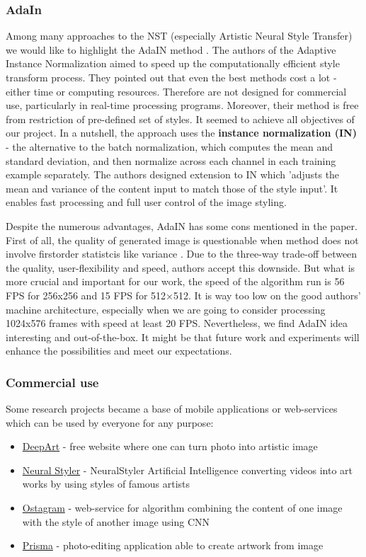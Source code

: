 \documentclass[../Main.tex]{subfiles}
\begin{document}
    \subsubsection{AdaIn}
    Among many approaches to the NST (especially Artistic Neural Style Transfer) we would like to highlight the AdaIN method \cite{huang2017adain}. The authors of the Adaptive Instance Normalization aimed to speed up the computationally efficient style transform process. They pointed out that even the best methods cost a lot - either time or computing resources. Therefore are not designed for commercial use, particularly in real-time processing programs. Moreover, their method is free from restriction of pre-defined set of styles. It seemed to achieve all objectives of our project.
    In a nutshell, the approach uses the \textbf{instance normalization (IN)} - the alternative to the batch normalization, which computes the mean and standard deviation, and then normalize across each channel in each training example separately. The authors designed extension to IN which 'adjusts the mean and variance of the
    content input to match those of the style input'. It enables fast processing and full user control of the image styling.
    
    Despite the numerous advantages, AdaIN has some cons mentioned in the paper. First of all, the quality of generated image is questionable when method does not involve firstorder statistcis like variance . Due to the three-way trade-off between the quality, user-flexibility and speed, authors accept this downside. But what is more crucial and important for our work, the speed of the algorithm run is 56 FPS for 256x256 and 15 FPS for 512×512. It is way too low on the good authors' machine architecture, especially when we are going to consider processing 1024x576 frames with speed at least 20 FPS.
    Nevertheless, we find AdaIN idea interesting and out-of-the-box. It might be that future work and experiments will enhance the possibilities and meet our expectations.

    \subsubsection{Commercial use}
    Some research projects became a base of mobile applications or web-services which can be used by everyone for any purpose:
    \begin{itemize}
        \item \href{https://deepart.io}{DeepArt} - free website where one can turn photo into artistic image
        \item \href{http://neuralstyler.com}{Neural Styler} - NeuralStyler Artificial Intelligence converting videos into art works by using styles of famous artists
        \item \href{https://www.ostagram.me/static_pages/lenta?last_days=1000&locale=en}{Ostagram} - web-service for algorithm combining the content of one image with the style of another image using CNN
        \item \href{https://prisma-ai.com}{Prisma} - photo-editing application able to create artwork from image
    \end{itemize}
\end{document}
